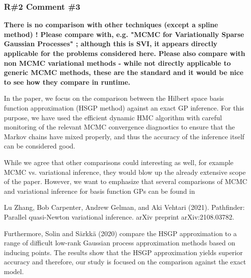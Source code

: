 \documentclass[11pt]{report}
\begin{document}
\subsubsection*{R\#2 Comment \#3}

\textbf{There is no comparison with other techniques (except a spline method) ! Please compare with, e.g. "MCMC for Variationally Sparse Gaussian Processes" ; although this is SVI, it appears directly applicable for the problems considered here. Please also compare with non MCMC variational methods - while not directly applicable to generic MCMC methods, these are the standard and it would be nice to see how they compare in runtime.}

In the paper, we focus on the comparison between the Hilbert space basis function approximation (HSGP method) against an exact GP inference. 
For this purpose, we have used the efficient dynamic HMC algorithm with careful monitoring of the relevant MCMC convergence diagnostics to ensure that the Markov chains have mixed properly, and thus the accuracy of the inference itself can be considered good. 

While we agree that other comparisons could interesting as well, for example MCMC vs. variational inference, they would blow up the already extensive scope of the paper. However, we want to emphasize that several comparisons of MCMC and variational inference for basis function GPs can be found in

Lu Zhang, Bob Carpenter, Andrew Gelman, and Aki Vehtari (2021). Pathfinder: Parallel quasi-Newton variational inference. arXiv preprint arXiv:2108.03782.

Furthermore, Solin and Särkkä (2020) compare the HSGP approximation to a range of difficult low-rank Gaussian process approximation methods based on inducing points. The results show that the HSGP approximation yields superior accuracy and therefore, our study is focused on the comparison against the exact model.



\end{document}
